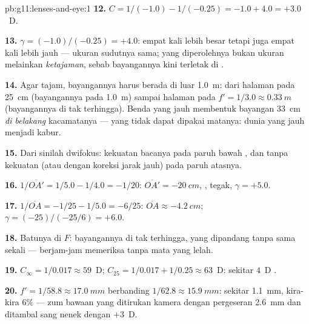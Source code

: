 \begin{solution}{pb:g11:lenses-and-eye:1}
\textbf{12.} $C = 1/(-1.0) - 1/(-0.25) = -1.0 + 4.0 = +3.0$~D.

\textbf{13.} $\gamma = (-1.0)/(-0.25) = +4.0$: empat kali lebih besar
tetapi juga empat kali lebih jauh --- ukuran sudutnya sama; yang
diperolehnya bukan ukuran melainkan \emph{ketajaman}, sebab bayangannya
kini terletak di .

\textbf{14.} Agar tajam, bayangannya harus berada di luar \qty{1.0}{m}:
dari halaman pada \qty{25}{cm} (bayangannya pada \qty{1.0}{m}) sampai
halaman pada $f' = 1/3.0 \approx \qty{0.33}{m}$ (bayangannya di tak
terhingga). Benda yang jauh membentuk bayangan \qty{33}{cm} \emph{di
belakang} kacamatanya ---  yang tidak dapat dipakai
matanya: dunia yang jauh menjadi kabur.

\textbf{15.} Dari sinilah  dwifokus: kekuatan bacanya pada paruh
bawah , dan tanpa kekuatan (atau dengan koreksi jarak jauh)
pada paruh atasnya.

\textbf{16.} $1/\overline{OA'} = 1/5.0 - 1/4.0 = -1/20$:
$\overline{OA'} = \qty{-20}{cm}$, , tegak, $\gamma = +5.0$.

\textbf{17.} $1/\overline{OA} = -1/25 - 1/5.0 = -6/25$:
$\overline{OA} \approx \qty{-4.2}{cm}$;
$\gamma = (-25)/(-25/6) = +6.0$.

\textbf{18.} Batunya di $F$: bayangannya di tak terhingga, yang
dipandang tanpa  sama sekali --- berjam-jam memeriksa tanpa
mata yang lelah.

\textbf{19.} $C_\infty = 1/0.017 \approx 59$~D;
$C_{25} = 1/0.017 + 1/0.25 \approx 63$~D: sekitar $4$~D .

\textbf{20.} $f' = 1/58.8 \approx \qty{17.0}{mm}$ berbanding
$1/62.8 \approx \qty{15.9}{mm}$: sekitar \qty{1.1}{mm}, kira-kira
$6\%$ --- zum bawaan yang ditirukan kamera dengan pergeseran
\qty{2.6}{mm} dan ditambal sang nenek dengan $+3$~D.
\end{solution}
